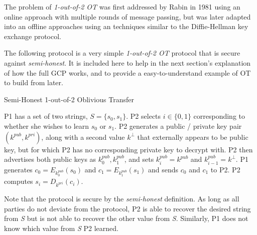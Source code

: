 The problem of \emph{1-out-of-2 \ac{OT}} was first addressed by Rabin\cite{rabin2005exchange} in 1981 using an online approach with multiple rounds of message passing, but was later adapted into an offline approaches using an techniques similar to the Diffie-Hellman key exchange protocol\cite{diffie1976new}.

The following protocol\cite{lindell2013technion} is a very simple \emph{1-out-of-2 \ac{OT}} protocol that is secure against \emph{semi-honest}. It is included here to help in the next section's explanation of how the full \ac{GCP} works, and to provide a easy-to-understand example of \ac{OT} to build from later.

\begin{algorithm}[H]
    \caption{Semi-Honest 1-out-of-2 Oblivious Transfer}
    \label{alg:otsemihonest}
    \begin{algorithmic}[1]
        \STATE \ac{P1} has a set of two strings, $S = \{s_0, s_1\}$.
        \STATE \ac{P2} selects $i \in \{0, 1\}$ corresponding to whether she wishes to learn $s_0$ or $s_1$.
        \STATE \ac{P2} generates a public / private key pair $(k^{pub}, k^{pri})$, along with a second value $k^\bot$ that externally appears to be public key, but for which \ac{P2} has no corresponding private key to decrypt with.
        \STATE \ac{P2} then advertises both public keys as $k^{pub}_0, k^{pub}_1$, and sets $k^{pub}_i = k^{pub}$ and $k^{pub}_{i-1} = k^\bot$.
        \STATE \ac{P1} generates $c_0 = E_{k^{pub}_0}(s_0)$ and $c_1 = E_{k^{pub}_1}(s_1)$ and sends $c_0$ and $c_1$ to \ac{P2}.
        \STATE \ac{P2} computes $s_i = D_{k^{pri}}(c_i)$.
    \end{algorithmic}
\end{algorithm}

Note that the protocol is secure by the \emph{semi-honest} definition. As long as all parties do not deviate from the protocol, \ac{P2} is able to recover the desired string from \emph{S} but is not able to recover the other value from \emph{S}. Similarly, \ac{P1} does not know which value from \emph{S} \ac{P2} learned.

